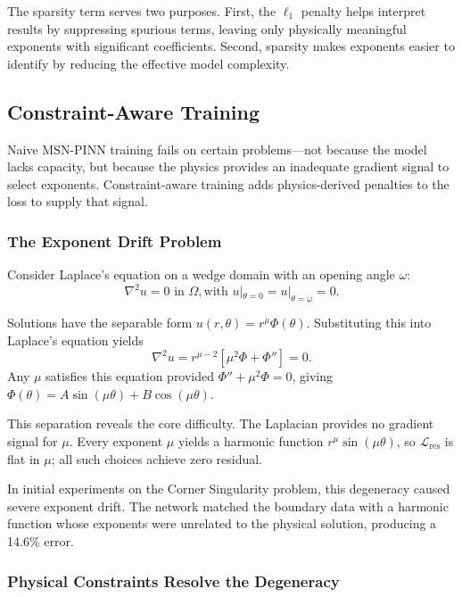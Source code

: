 \documentclass{article}
\theoremstyle{plain}
\theoremstyle{definition}
\theoremstyle{remark}
\newcommand{\mcL}{\mathcal{L}}
\begin{document}
The sparsity term serves two purposes. First, the $\ell_1$ penalty helps interpret results by suppressing spurious terms, leaving only physically meaningful exponents with significant coefficients. Second, sparsity makes exponents easier to identify by reducing the effective model complexity.

\subsection{Constraint-Aware Training}
\label{sec:constraint_aware}

Naive MSN-PINN training fails on certain problems---not because the model lacks capacity, but because the physics provides an inadequate gradient signal to select exponents. Constraint-aware training adds physics-derived penalties to the loss to supply that signal.

\subsubsection{The Exponent Drift Problem}

Consider Laplace's equation on a wedge domain with an opening angle $\omega$:
\begin{equation}
	\nabla^2 u = 0 \text{ in } \Omega, \text{with } u|_{\theta=0} = u|_{\theta=\omega} = 0.
\end{equation}

Solutions have the separable form $u(r,\theta) = r^\mu \Phi(\theta)$. Substituting this into Laplace's equation yields
\begin{equation}
	\nabla^2 u = r^{\mu-2}[\mu^2 \Phi + \Phi''] = 0.
\end{equation}
Any $\mu$ satisfies this equation provided $\Phi'' + \mu^2 \Phi = 0$, giving $\Phi(\theta) = A\sin(\mu\theta) + B\cos(\mu\theta)$.

This separation reveals the core difficulty. The Laplacian provides no gradient signal for $\mu$. Every exponent $\mu$ yields a harmonic function $r^\mu \sin(\mu\theta)$, so $\mcL_{\text{res}}$ is flat in $\mu$; all such choices achieve zero residual.

In initial experiments on the Corner Singularity problem, this degeneracy caused severe exponent drift. The network matched the boundary data with a harmonic function whose exponents were unrelated to the physical solution, producing a 14.6\% error.

\subsubsection{Physical Constraints Resolve the Degeneracy}
\end{document}
